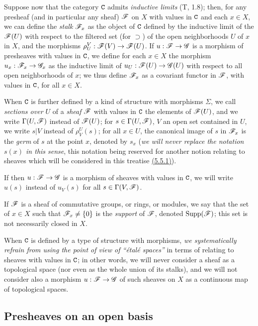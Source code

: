 \begin{env}[3.1.6]
\label{0.3.1.6}
Suppose now that the category $\mathtt{C}$ admits {\em inductive limits} (T, 1.8);
then, for any presheaf (and in particular any sheaf) $\mathscr{F}$ on $X$ with values
in $\mathtt{C}$ and each $x\in X$, we can define the {\em stalk} $\mathscr{F}_x$ as the
object of $\mathtt{C}$ defined by the inductive limit of the $\mathscr{F}(U)$ with respect to
the filtered set (for $\supset$) of the open neighborhoods $U$ of $x$ in $X$,
and the morphisms $\rho_U^V:\mathscr{F}(V)\to\mathscr{F}(U)$. If $u:\mathscr{F}\to\mathscr{G}$ is a
morphism of presheaves with values in $\mathtt{C}$, we define for each $x\in X$ the
morphism $u_x:\mathscr{F}_x\to\mathscr{G}_x$ as the inductive limit of
$u_U:\mathscr{F}(U)\to\mathscr{G}(U)$ with respect to all open neighborhoods of $x$; we
thus define $\mathscr{F}_x$ as a covariant functor in $\mathscr{F}$, with values in $\mathtt{C}$,
for all $x\in X$.

When $\mathtt{C}$ is further defined by a kind of structure with morphisms $\Sigma$, we
call {\em sections over $U$} of a {\em sheaf} $\mathscr{F}$ with values in $\mathtt{C}$ the
elements of $\mathscr{F}(U)$, and we write $\Gamma(U,\mathscr{F})$ instead of $\mathscr{F}(U)$;
for $s\in\Gamma(U,\mathscr{F})$, $V$ an open set contained in $U$, we write $s|V$
instead of $\rho_V^U(s)$; for all $x\in U$, the canonical image of $s$ in
$\mathscr{F}_x$ is the {\em germ} of $s$ at the point $x$, denoted by $s_x$
({\em we will never replace the notation $s(x)$ in this sense}, this notation
being reserved for another notion relating to sheaves which will be considered
in this treatise \hyperref[0.5.5.1]{(5.5.1)}).

If then $u:\mathscr{F}\to\mathscr{G}$ is a morphism of sheaves with values in $\mathtt{C}$, we
will write $u(s)$ instead of $u_V(s)$ for all $s\in\Gamma(V,\mathscr{F})$.

If $\mathscr{F}$ is a sheaf of commutative groups, or rings, or modules, we say that
the set of $x\in X$ such that $\mathscr{F}_x\neq\{0\}$ is the {\em support} of
$\mathscr{F}$, denoted ${\mathop{\mathrm{Supp}}\nolimits}(\mathscr{F})$; this set is not necessarily closed in $X$.

When $\mathtt{C}$ is defined by a type of structure with morphisms, {\em we
systematically refrain from using the point of view of ``\'etal\'e spaces''} in
terms of relating to sheaves with values in $\mathtt{C}$; in other words, we will never
consider a sheaf as a topological space (nor even as the whole union of its
stalks), and we will not consider also a morphism $u:\mathscr{F}\to\mathscr{G}$ of such
sheaves on $X$ as a continuous map of topological spaces.
\end{env}

\subsection{Presheaves on an open basis}
\label{subsection-presheaves-on-open-basis}

